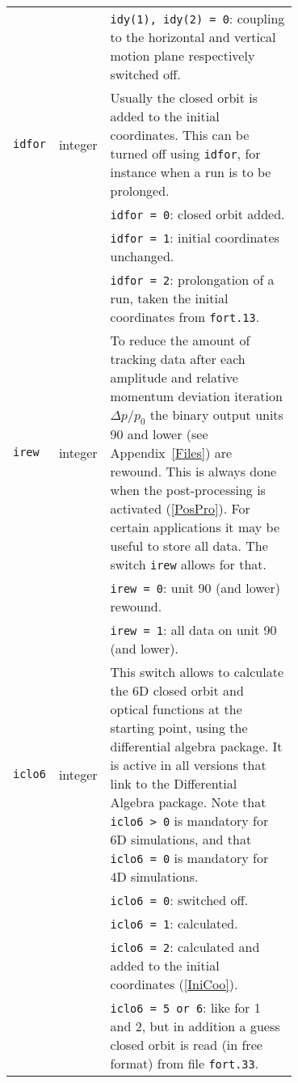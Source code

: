 \begin{longtabu}{@{}llp{0.7\linewidth}}
                           &          & \texttt{idy(1), idy(2) = 0}: coupling to the horizontal and vertical motion plane respectively switched off. \\
    \texttt{idfor}         & integer  & Usually the closed orbit is added to the initial coordinates. This can be turned off using \texttt{idfor}, for instance when a run is to be prolonged. \\
                           &          & \texttt{idfor = 0}: closed orbit added. \\
                           &          & \texttt{idfor = 1}: initial coordinates unchanged. \\
                           &          & \texttt{idfor = 2}: prolongation of a run, taken the initial coordinates from \texttt{fort.13}. \\
    \texttt{irew}          & integer  & To reduce the amount of tracking data after each amplitude and relative momentum deviation iteration $\Delta p/p_0$ the binary output units 90 and lower (see Appendix~\ref{Files}) are rewound. This is always done when the post-processing is activated (\ref{PosPro}). For certain applications it may be useful to store all data. The switch \texttt{irew} allows for that. \\
                           &          & \texttt{irew = 0}: unit 90 (and lower) rewound. \\
                           &          & \texttt{irew = 1}: all data on unit 90 (and lower). \\
    \texttt{iclo6}         & integer  & This switch allows to calculate the 6D closed orbit and optical functions at the starting point, using the differential algebra package. It is active in all versions that link to the Differential Algebra package.  Note that \texttt{iclo6 > 0} is mandatory for 6D simulations, and that \texttt{iclo6 = 0} is mandatory for 4D simulations. \\
                           &          & \texttt{iclo6 = 0}: switched off. \\
                           &          & \texttt{iclo6 = 1}: calculated. \\
                           &          & \texttt{iclo6 = 2}: calculated and added to the initial coordinates (\ref{IniCoo}). \\
                           &          & \texttt{iclo6 = 5 or 6}: like for 1 and 2, but in addition a guess closed orbit is read (in free format) from file \texttt{fort.33}. \\

\end{longtabu}
